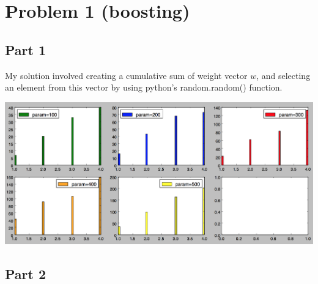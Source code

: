 \documentclass[11pt]{article}
\begin{document}

\section*{Problem 1 (boosting)}

\subsection*{Part 1}

My solution involved creating a cumulative sum of weight vector $w$, and selecting an element from this vector by using python's random.random() function.

\includegraphics[scale=.4]{images/bootstrap.png}

\subsection*{Part 2}
\end{document}
